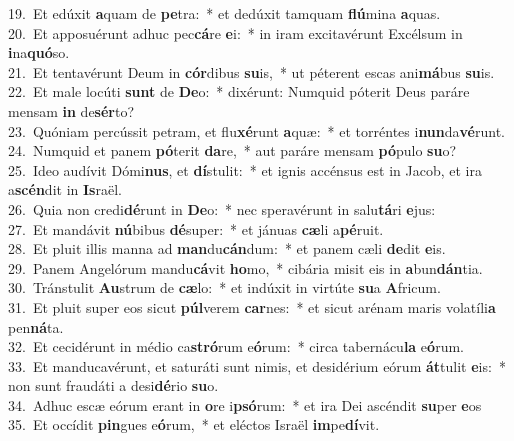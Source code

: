 {19.~}Et edúxit \textbf{a}quam de \textbf{pe}tra:~* et dedúxit tamquam \textbf{flú}mina \textbf{a}quas.\\
{20.~}Et apposuérunt adhuc pec\textbf{cá}re \textbf{e}i:~* in iram excitavérunt Excélsum in \textbf{i}na\textbf{quó}so.\\
{21.~}Et tentavérunt Deum in \textbf{cór}dibus \textbf{su}is,~* ut péterent escas ani\textbf{má}bus \textbf{su}is.\\
{22.~}Et male locúti \textbf{sunt} de \textbf{De}o:~* dixérunt: Numquid póterit Deus paráre mensam \textbf{in} de\textbf{sér}to?\\
{23.~}Quóniam percússit petram, et flu\textbf{xé}runt \textbf{a}quæ:~* et torréntes i\textbf{nun}da\textbf{vé}runt.\\
{24.~}Numquid et panem \textbf{pó}terit \textbf{da}re,~* aut paráre mensam \textbf{pó}pulo \textbf{su}o?\\
{25.~}Ideo audívit Dómi\textbf{nus}, et \textbf{dí}stulit:~* et ignis accénsus est in Jacob, et ira a\textbf{scén}dit in \textbf{Is}raël.\\
{26.~}Quia non credi\textbf{dé}runt in \textbf{De}o:~* nec speravérunt in salu\textbf{tá}ri \textbf{e}jus:\\
{27.~}Et mandávit \textbf{nú}bibus \textbf{dé}super:~* et jánuas \textbf{cæ}li a\textbf{pé}ruit.\\
{28.~}Et pluit illis manna ad \textbf{man}du\textbf{cán}dum:~* et panem cæli \textbf{de}dit \textbf{e}is.\\
{29.~}Panem Angelórum mandu\textbf{cá}vit \textbf{ho}mo,~* cibária misit eis in \textbf{a}bun\textbf{dán}tia.\\
{30.~}Tránstulit \textbf{Au}strum de \textbf{cæ}lo:~* et indúxit in virtúte \textbf{su}a \textbf{A}fricum.\\
{31.~}Et pluit super eos sicut \textbf{púl}verem \textbf{car}nes:~* et sicut arénam maris volatíli\textbf{a} pen\textbf{ná}ta.\\
{32.~}Et cecidérunt in médio ca\textbf{stró}rum e\textbf{ó}rum:~* circa tabernácu\textbf{la} e\textbf{ó}rum.\\
{33.~}Et manducavérunt, et saturáti sunt nimis, et desidérium eórum \textbf{át}tulit \textbf{e}is:~* non sunt fraudáti a desi\textbf{dé}rio \textbf{su}o.\\
{34.~}Adhuc escæ eórum erant in \textbf{o}re i\textbf{psó}rum:~* et ira Dei ascéndit \textbf{su}per \textbf{e}os\\
{35.~}Et occídit \textbf{pin}gues e\textbf{ó}rum,~* et eléctos Israël \textbf{im}pe\textbf{dí}vit.\\
